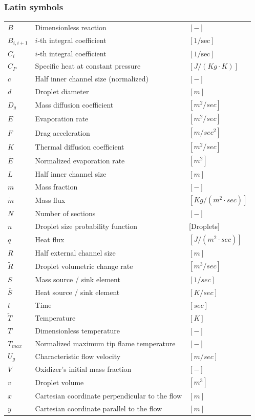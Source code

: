\documentclass[12pt]{article}
\numberwithin{equation}{section}
\begin{document}
\begin{flushleft}
\subsubsection*{Latin symbols}
\begin{tabular}{ p{1.5cm} p{10cm} p{3cm} }
$B$ & Dimensionless reaction & $[-]$ \\
$B_{i, i+1}$ & $i$-th integral coefficient & $[1/\text{sec}]$ \\
$C_{i}$ & $i$-th integral coefficient & $[1/\text{sec}]$ \\
$C_P$ & Specific heat at constant pressure & $[J/(Kg \cdot K)]$ \\
$c$ & Half inner channel size (normalized) & $[-]$ \\
$d$ & Droplet diameter & $[m]$ \\
$D_g$ & Mass diffusion coefficient & $[m^2/sec]$ \\
$E$ & Evaporation rate & $[m^2/sec]$ \\
$F$ & Drag acceleration & $[m/sec^2]$ \\
$K$ & Thermal diffusion coefficient & $[m^2/sec]$ \\
$\bar{E}$ & Normalized evaporation rate & $[m^2]$ \\
$L$ & Half inner channel size & $[m]$ \\
$m$ & Mass fraction & $[-]$ \\
$\dot{m}$ & Mass flux & $[Kg / (m^2 \cdot sec)]$ \\
$N$ & Number of sections & $[-]$ \\
$n$ & Droplet size probability function & [Droplets] \\
$q$ & Heat flux & $[J/(m^2 \cdot sec)]$ \\
$R$ & Half external channel size & $[m]$ \\
$\tilde{R}$ & Droplet volumetric change rate & $[m^3/sec]$ \\
$S$ & Mass source / sink element & $[1/sec]$ \\
$\bar{S}$ & Heat source / sink element & $[K/sec]$ \\
$t$ & Time & $[sec]$ \\
$\tilde{T}$ & Temperature & $[K]$ \\
$T$ & Dimensionless temperature & $[-]$ \\
$T_{max}$ & Normalized maximum tip flame temperature & $[-]$ \\
$U_g$ & Characteristic flow velocity & $[m/sec]$ \\
$V$ & Oxidizer's initial mass fraction & $[-]$ \\
$v$ & Droplet volume & $[m^3]$ \\
$x$ & Cartesian coordinate perpendicular to the flow & $[m]$ \\
$y$ & Cartesian coordinate parallel to the flow & $[m]$ \\
\end{tabular}


\end{flushleft}
\end{document}
